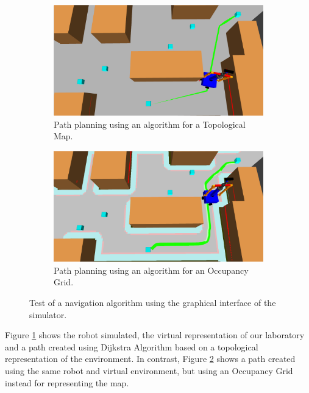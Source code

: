 \documentclass{llncs}
\begin{document}
\begin{figure}[h]
	\centering
	\begin{subfigure}{0.49\textwidth}
		\includegraphics[width=\textwidth]{Figures/simulator1.png} 
		\caption{Path planning using an algorithm for a Topological Map.}
		\label{fig:Simulator1}
	\end{subfigure}
	\begin{subfigure}{0.49\textwidth}
		\includegraphics[width=\textwidth]{Figures/simulator2.png}
		\caption{Path planning using an algorithm for an Occupancy Grid.}
		\label{fig:Simulator2}
		\end{subfigure}
	\caption{Test of a navigation algorithm using the graphical interface of the simulator. }
	\label{fig:Simulator}
\end{figure}

Figure \ref{fig:Simulator1} shows the robot simulated, the virtual representation of our laboratory and a path created using Dijkstra Algorithm based on a topological representation of the environment. In contrast, Figure \ref{fig:Simulator2} shows a path created using the same robot and virtual environment, but using an Occupancy Grid instead for representing the map.
\end{document}
